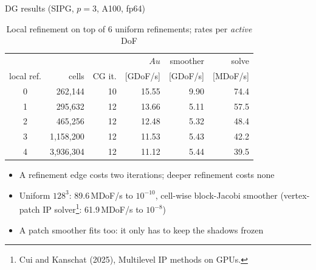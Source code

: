 \documentclass{beamer}
\begin{document}
\begin{frame}{DG results (SIPG, $p=3$, A100, fp64)}
    \begin{table}
        \centering
        \caption{Local refinement on top of $6$ uniform refinements; rates per \emph{active} DoF}
        \footnotesize
        \begin{tabular}{c|rr|rrr}
            \toprule
                       &           &        & $Au$     & smoother & solve    \\
            local ref. & cells     & CG it. & [GDoF/s] & [GDoF/s] & [MDoF/s] \\
            \midrule
            0          & 262,144   & 10     & 15.55    & 9.90     & 74.4     \\
            1          & 295,632   & 12     & 13.66    & 5.11     & 57.5     \\
            2          & 465,256   & 12     & 12.48    & 5.32     & 48.4     \\
            3          & 1,158,200 & 12     & 11.53    & 5.43     & 42.2     \\
            4          & 3,936,304 & 12     & 11.12    & 5.44     & 39.5     \\
            \bottomrule
        \end{tabular}
    \end{table}
    \begin{itemize}
        \small
        \item A refinement edge costs \alert{two iterations}; deeper refinement costs \alert{none}
        \item Uniform $128^3$: \alert{89.6\,MDoF/s} to $10^{-10}$, cell-wise block-Jacobi smoother (vertex-patch IP
              solver\footnote{Cui and Kanschat (2025), Multilevel IP methods on GPUs.}: 61.9\,MDoF/s to $10^{-8}$)
        \item A patch smoother fits too: it only has to keep the shadows frozen
    \end{itemize}
\end{frame}

\end{document}
